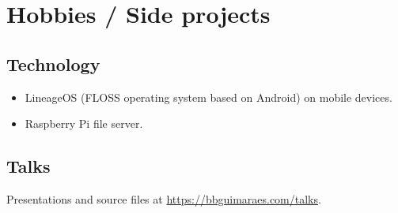 \section*{Hobbies / Side projects}

\subsection*{Technology}

\begin{itemize}
    \item
        LineageOS (FLOSS operating system based on Android) on mobile devices.
    \item Raspberry Pi file server.
\end{itemize}

\subsection*{Talks}

Presentations and source files at \url{https://bbguimaraes.com/talks}.

